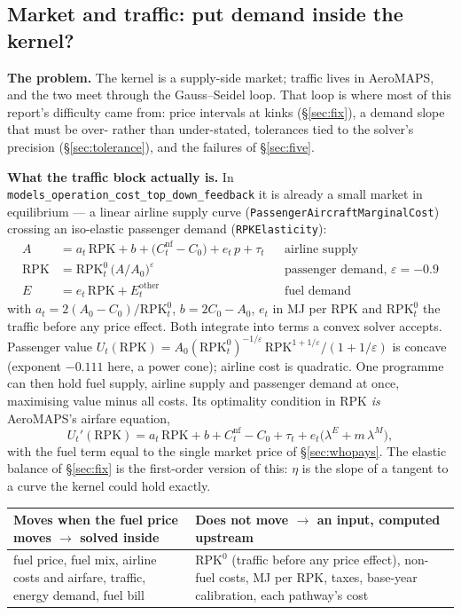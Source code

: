 \documentclass[11pt,a4paper]{article}
\newcommand{\var}[1]{\texttt{\small #1}}
\begin{document}
\subsection{Market and traffic: put demand inside the kernel?}
\label{sec:demandinside}

\textbf{The problem.} The kernel is a supply-side market; traffic lives in AeroMAPS, and the
two meet through the Gauss--Seidel loop. That loop is where most of this report's difficulty
came from: price intervals at kinks (\S\ref{sec:fix}), a demand slope that must be over- rather
than under-stated, tolerances tied to the solver's precision (\S\ref{sec:tolerance}), and the
failures of \S\ref{sec:five}.

\textbf{What the traffic block actually is.} In \var{models\_operation\_cost\_top\_down\_feedback}
it is already a small market in equilibrium --- a linear airline supply curve
(\var{PassengerAircraftMarginalCost}) crossing an iso-elastic passenger demand
(\var{RPKElasticity}):
\begin{align*}
A &= a_t\,\mathrm{RPK} + b + \big(C^{\mathrm{nf}}_t - C_0\big) + e_t\,p + \tau_t
  && \text{airline supply}\\
\mathrm{RPK} &= \mathrm{RPK}^0_t\,\big(A/A_0\big)^{\varepsilon}
  && \text{passenger demand, } \varepsilon = -0.9\\
E &= e_t\,\mathrm{RPK} + E^{\mathrm{other}}_t
  && \text{fuel demand}
\end{align*}
with $a_t = 2(A_0 - C_0)/\mathrm{RPK}^0_t$, $b = 2C_0 - A_0$, $e_t$ in MJ per RPK and
$\mathrm{RPK}^0_t$ the traffic before any price effect.
Both integrate into terms a convex solver accepts. Passenger value
$U_t(\mathrm{RPK}) = A_0 (\mathrm{RPK}^0_t)^{-1/\varepsilon}\,
\mathrm{RPK}^{1+1/\varepsilon}/(1+1/\varepsilon)$ is concave (exponent $-0.111$ here, a power
cone); airline cost is quadratic. One programme can then hold fuel supply, airline supply
and passenger demand at once, maximising value minus all costs. Its optimality condition in
RPK \emph{is} AeroMAPS's airfare equation,
\[
  U_t'(\mathrm{RPK}) = a_t\,\mathrm{RPK} + b + C^{\mathrm{nf}}_t - C_0 + \tau_t
  + e_t\big(\lambda^{E} + m\,\lambda^{M}\big),
\]
with the fuel term equal to the single market price of \S\ref{sec:whopays}. The elastic
balance of \S\ref{sec:fix} is the first-order version of this: $\eta$ is the slope of a
tangent to a curve the kernel could hold exactly.

\begin{center}\small
\begin{tabular}{@{}p{7.4cm}p{7.8cm}@{}}
\toprule
\textbf{Moves when the fuel price moves $\rightarrow$ solved inside} &
\textbf{Does not move $\rightarrow$ an input, computed upstream} \\
\midrule
fuel price, fuel mix, airline costs and airfare, traffic, energy demand, fuel bill &
$\mathrm{RPK}^0$ (traffic before any price effect), non-fuel costs, MJ per RPK, taxes,
base-year calibration, each pathway's cost \\
\bottomrule
\end{tabular}
\end{center}
\end{document}
